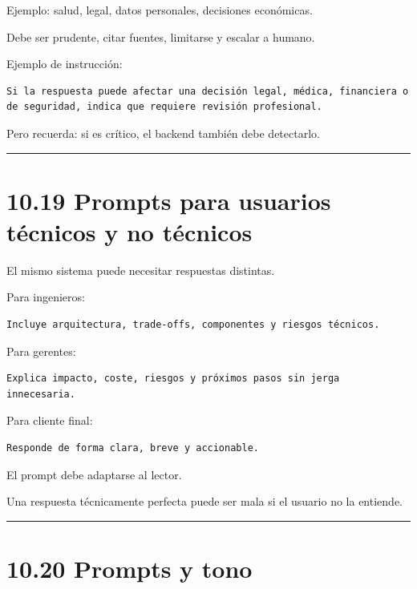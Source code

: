 Ejemplo: salud, legal, datos personales, decisiones económicas.

Debe ser prudente, citar fuentes, limitarse y escalar a humano.

Ejemplo de instrucción:

\begin{lstlisting}
Si la respuesta puede afectar una decisión legal, médica, financiera o de seguridad, indica que requiere revisión profesional.
\end{lstlisting}

Pero recuerda: si es crítico, el backend también debe detectarlo.

\begin{center}\rule{0.5\linewidth}{0.5pt}\end{center}

\section{10.19 Prompts para usuarios técnicos y no
técnicos}\label{prompts-para-usuarios-tuxe9cnicos-y-no-tuxe9cnicos}

El mismo sistema puede necesitar respuestas distintas.

Para ingenieros:

\begin{lstlisting}
Incluye arquitectura, trade-offs, componentes y riesgos técnicos.
\end{lstlisting}

Para gerentes:

\begin{lstlisting}
Explica impacto, coste, riesgos y próximos pasos sin jerga innecesaria.
\end{lstlisting}

Para cliente final:

\begin{lstlisting}
Responde de forma clara, breve y accionable.
\end{lstlisting}

El prompt debe adaptarse al lector.

Una respuesta técnicamente perfecta puede ser mala si el usuario no la
entiende.

\begin{center}\rule{0.5\linewidth}{0.5pt}\end{center}

\section{10.20 Prompts y tono}\label{prompts-y-tono}

